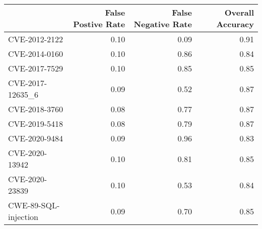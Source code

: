 \begin{tabular}{lrrr}
\toprule
{} &  False Postive Rate &  False Negative Rate &  Overall Accuracy \\
\midrule
CVE-2012-2122        &                0.10 &                 0.09 &              0.91 \\
CVE-2014-0160        &                0.10 &                 0.86 &              0.84 \\
CVE-2017-7529        &                0.10 &                 0.85 &              0.85 \\
CVE-2017-12635\_6     &                0.09 &                 0.52 &              0.87 \\
CVE-2018-3760        &                0.08 &                 0.77 &              0.87 \\
CVE-2019-5418        &                0.08 &                 0.79 &              0.87 \\
CVE-2020-9484        &                0.09 &                 0.96 &              0.83 \\
CVE-2020-13942       &                0.10 &                 0.81 &              0.85 \\
CVE-2020-23839       &                0.10 &                 0.53 &              0.84 \\
CWE-89-SQL-injection &                0.09 &                 0.70 &              0.85 \\
\bottomrule
\end{tabular}
